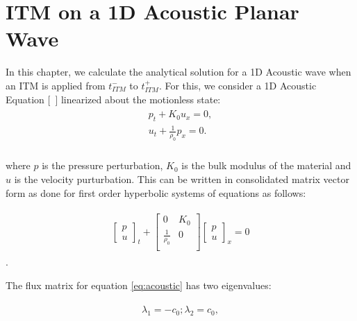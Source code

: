 
\chapter{\ac{ITM} on a 1D Acoustic Planar Wave}\label{chapter:ITMAcoustic}
In this chapter, we calculate the analytical solution for a 1D Acoustic wave when an \ac{ITM} is applied from $t_{ITM}^-$ to $t_{ITM}^+$.
For this, we consider a 1D Acoustic Equation [~\parencite[Sec. 2.8]{leveque_2002}] linearized about the motionless state:
\begin{align}
    \begin{split}
        p_t + K_0u_x = 0, \\
        u_t + \frac{1}{\rho_0}p_x = 0 .\\
    \end{split}
\end{align}

where $p$ is the pressure perturbation, $K_0$ is the bulk modulus of the material and $u$ is the velocity purturbation. 
This can be written in consolidated matrix vector form as done for first order hyperbolic systems of equations as follows:

\begin{align}
    \begin{split}
    \begin{bmatrix}
        p \\
        u
    \end{bmatrix}_t + 
    \begin{bmatrix}
        0 & K_0 \\
        \frac{1}{\rho_0} & 0 \\
    \end{bmatrix}
    \begin{bmatrix}
        p \\
        u
    \end{bmatrix}_x = 0
    \end{split}
    \label{eq:acoustic}
\end{align}.

The flux matrix for equation \ref{eq:acoustic} has two eigenvalues:

\begin{align}
    \begin{split}
        \lambda_1 = -c_0; \lambda_2 = c_0,
    \end{split}
\end{align}

